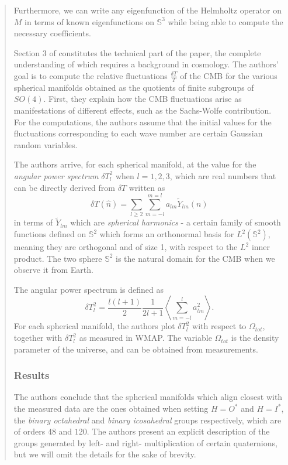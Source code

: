 \documentclass{article}
\theoremstyle{definition}
\begin{document}
\begin{abstract}
Furthermore, we can write any eigenfunction of the Helmholtz operator on $M$ in terms of known eigenfunctions on $\mathbb{S}^3$ while being able to compute the necessary coefficients.

Section 3 of \cite{aurich_2005} constitutes the technical part of the paper, the complete understanding of which requires a background in cosmology. The authors' goal is to compute the relative fluctuations $\frac{\delta T}{T}$ of the CMB for the various spherical manifolds obtained as the quotients of finite subgroups of $SO(4)$. First, they explain how the CMB fluctuations arise as manifestations of different effects, such as the Sachs-Wolfe contribution. For the computations, the authors assume that the initial values for the fluctuations corresponding to each wave number are certain Gaussian random variables.


The authors arrive, for each spherical manifold, at the value for the \emph{angular power spectrum} $\delta T^2_l$ when $l = 1,2,3$, which are real numbers that can be directly derived from $\delta T$ written as
$$\delta T  (\hat{n}) =\sum_{l \geq 2}\sum_{m = -l}^{m = l}a_{lm}\tilde{Y}_{lm}(n)$$
in terms of $\tilde{Y}_{lm}$ which are \emph{spherical harmonics}  - a certain family of smooth functions defined on $\mathbb{S}^2$ which forms an orthonormal basis for $L^2(\mathbb{S}^2)$, meaning they are orthogonal and of size 1, with respect to the $L^2$ inner product. The two sphere $\mathbb{S}^2$ is the natural domain for the CMB when we observe it from Earth.

The angular power spectrum is defined as
$$\delta T^2_l = \frac{l(l+1)}{2}\frac{1}{2l+1 }\left\langle \sum_{m = -l}^la_{lm}^2\right\rangle.$$
For each spherical manifold, the authors plot $\delta T_l^2$ with respect to $\Omega_{tot}$, together with $\delta T^2_l$ as measured in WMAP. The variable $\Omega_{tot}$ is the density parameter of the universe, and can be obtained from measurements.

\subsubsection{Results}


The authors conclude that the spherical manifolds which align closest with the measured data are the ones obtained when setting $H = O^*$ and $H = I^*$, the \textit{binary octahedral} and \textit{binary icosahedral} groups respectively, which are of orders $48$ and $120$. The authors present an explicit description of the groups generated by left- and right- multiplication of certain quaternions, but we will omit the details for the sake of brevity.


\end{abstract}
\end{document}
